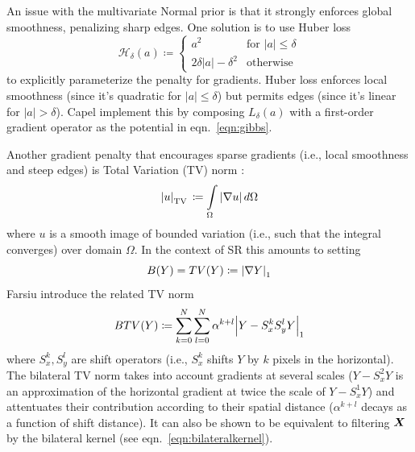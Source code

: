An issue with the multivariate Normal prior is that it strongly enforces global smoothness, penalizing sharp edges.
%
One solution is to use Huber loss \cite{huber1964}
\begin{equation}
    \mathcal{H}_{\delta }(a)\coloneqq {
        \begin{cases}
            a^2                                 & \text{for }\lvert a \rvert \leq \delta \\
            2 \delta \lvert a \rvert - \delta^2 & {\text{otherwise}}
        \end{cases}
    }
\end{equation}
to explicitly parameterize the penalty for gradients.
%
Huber loss enforces local smoothness (since it's quadratic for \(\lvert a \rvert \leq \delta\)) but permits edges (since it's linear for \(\lvert a \rvert > \delta\)).
%
Capel \etal \cite{capel2000} implement this by composing \(L_{\delta }(a)\) with a first-order gradient operator as the potential in eqn.~\eqref{eqn:gibbs}.

Another gradient penalty that encourages sparse gradients (i.e., local smoothness and steep edges) is Total Variation (TV) norm \cite{RUDIN1992259}:
\begin{equation}
    \abs{u}_{\operatorname {TV}}\,\coloneqq\int\limits _{\Omega }\abs{\nabla u}\,d\Omega
\end{equation}
where \(u\) is a smooth image of bounded variation (i.e., such that the integral converges) over domain \(\Omega\).
%
In the context of SR this amounts to setting
\begin{equation}
    B(Y) = TV(Y) \coloneqq \abs{ \nabla Y }_1
\end{equation}
%
Farsiu \etal \cite{farsiu} introduce the related  TV norm
\begin{equation}
    BTV(Y) \coloneqq \sum_{k=0}^{N} \sum_{l=0}^{N} \alpha^{k + l} \abs{ Y - S_x^k S_y^l Y }_1
\end{equation}
where \(S_x^k, S_y^l\) are shift operators (i.e., \(S_x^k\) shifts \(Y\) by \(k\) pixels in the horizontal).
%
The bilateral TV norm takes into account gradients at several scales (\(Y - S_x^2 Y\) is an approximation of the horizontal gradient at twice the scale of \(Y - S_x^1 Y\)) and attentuates their contribution according to their spatial distance (\(\alpha^{k+l}\) decays as a function of shift distance).
%
It can also be shown to be equivalent \cite{elad2002} to filtering \(\bm{X}\) by the bilateral kernel (see eqn.~\eqref{eqn:bilateralkernel}).

